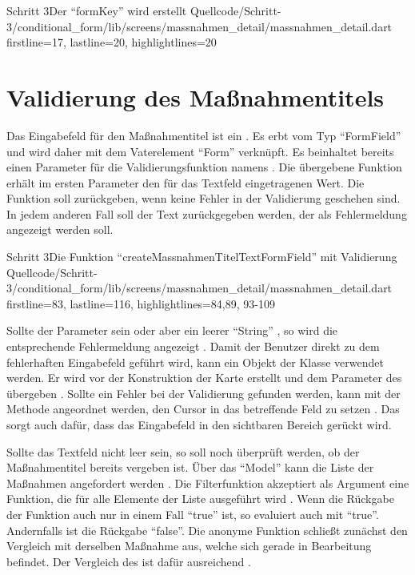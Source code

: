 \begin{alexlisting}{Schritt 3}{Der \enquote{formKey} wird erstellt}
    {Quellcode/Schritt-3/conditional_form/lib/screens/massnahmen_detail/massnahmen_detail.dart}
    {firstline=17, lastline=20, highlightlines={20}}
    \label{lst:Schritt3FormState}
\end{alexlisting}

\section{Validierung des Maßnahmentitels}

Das Eingabefeld für den Maßnahmentitel ist ein  .
Es erbt vom Typ \enquote{FormField} und wird daher mit dem Vaterelement \enquote{Form} verknüpft.
Es beinhaltet bereits einen Parameter für die Validierungsfunktion namens  .
Die übergebene Funktion erhält im ersten Parameter den für das Textfeld eingetragenen Wert.
Die Funktion soll  zurückgeben, wenn keine Fehler in der Validierung geschehen sind.
In jedem anderen Fall soll der Text zurückgegeben werden, der als Fehlermeldung angezeigt werden soll.

\begin{alexlisting}{Schritt 3}{Die Funktion \enquote{createMassnahmenTitelTextFormField} mit Validierung}
    {Quellcode/Schritt-3/conditional_form/lib/screens/massnahmen_detail/massnahmen_detail.dart}
    {firstline=83, lastline=116, highlightlines={84,89, 93-109}}
    \label{lst:Schritt3createMassnahmenTitelTextFormFieldValidator}
\end{alexlisting}

Sollte der Parameter  sein oder aber ein leerer \enquote{String} , so wird die entsprechende Fehlermeldung  angezeigt .
Damit der Benutzer direkt zu dem fehlerhaften Eingabefeld geführt wird, kann ein Objekt der Klasse  verwendet werden.
Er wird vor der Konstruktion der Karte erstellt  und dem Parameter  des  übergeben .
Sollte ein Fehler bei der Validierung gefunden werden, kann mit der Methode  angeordnet werden, den Cursor in das betreffende Feld zu setzen .
Das sorgt auch dafür, dass das Eingabefeld in den sichtbaren Bereich gerückt wird.

Sollte das Textfeld nicht leer sein, so soll noch überprüft werden, ob der Maßnahmentitel bereits vergeben ist.
Über das \enquote{Model} kann die Liste der Maßnahmen angefordert werden .
Die Filterfunktion  akzeptiert als Argument eine Funktion, die für alle Elemente der Liste ausgeführt wird .
Wenn die Rückgabe der Funktion auch nur in einem Fall \enquote{true} ist, so evaluiert auch  mit \enquote{true}.
Andernfalls ist die Rückgabe \enquote{false}. 
Die anonyme Funktion schließt zunächst den Vergleich mit derselben Maßnahme aus, welche sich gerade in Bearbeitung befindet.
Der Vergleich des  ist dafür ausreichend .

